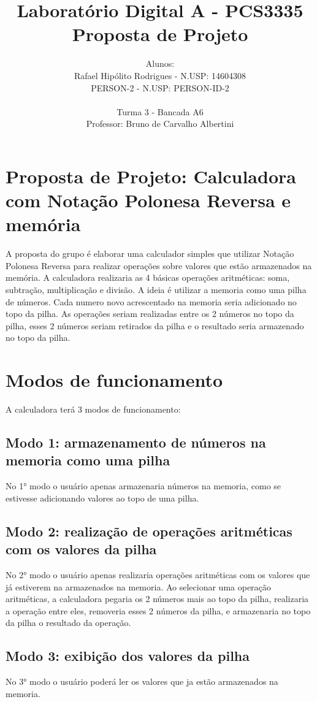 \documentclass[12pt, a4paper]{article}
\title{
	Laboratório Digital A - PCS3335
	\\ Proposta de Projeto
}
\author{
	Alunos:
	\\ Rafael Hipólito Rodrigues - N.USP: 14604308
	\\ {{PERSON-2}} - N.USP: {{PERSON-ID-2}}
	\\ \\
	Turma 3 - Bancada A6
	\\ Professor: Bruno de Carvalho Albertini
}
\begin{document}
	
	\maketitle
	
	\section*{Proposta de Projeto: Calculadora com Notação Polonesa Reversa e memória} 
	
	A proposta do grupo é elaborar uma calculador simples que utilizar Notação Polonesa Reversa para realizar operações 
	sobre valores que estão armazenados na memória. A calculadora realizaria as 4 básicas operações aritméticas: soma, subtração, 
	multiplicação e divisão. A ideia é utilizar a memoria como uma pilha de números. Cada numero novo acrescentado na memoria seria 
	adicionado no topo da pilha. As operações seriam realizadas entre os 2 números no topo da pilha, esses 2 números seriam retirados
	da pilha e o resultado seria armazenado no topo da pilha.
	
	
	
	\section*{Modos de funcionamento}
	
	A calculadora terá 3 modos de funcionamento:
	
	\subsection*{Modo 1: armazenamento de números na memoria como uma pilha}
	No 1° modo o usuário apenas armazenaria números na memoria, como se estivesse adicionando valores ao topo de uma pilha.
	
	\subsection*{Modo 2: realização de operações aritméticas com os valores da pilha}
	No 2° modo o usuário apenas realizaria operações aritméticas com os valores que já estiverem na armazenados na memoria. Ao selecionar 
	uma operação aritméticas, a calculadora pegaria os 2 números mais ao topo da pilha, realizaria a operação entre eles, removeria esses 2 números da 
	pilha, e armazenaria no topo da pilha o resultado da operação.
	
	\subsection*{Modo 3: exibição dos valores da pilha}
	No 3° modo o usuário poderá ler os valores que ja estão armazenados na memoria.
	
\end{document}
